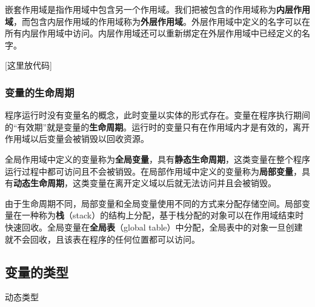 嵌套作用域是指作用域中包含另一个作用域。我们把被包含的作用域称为\textbf{内层作用域}，而包含内层作用域的作用域称为\textbf{外层作用域}。外层作用域中定义的名字可以在所有内层作用域中访问。内层作用域还可以重新绑定在外层作用域中已经定义的名字。

[这里放代码]

\subsubsection{变量的生命周期}

程序运行时没有变量名的概念，此时变量以实体的形式存在。变量在程序执行期间的``有效期''就是变量的\textbf{生命周期}。运行时的变量只有在作用域内才是有效的，离开作用域以后变量会被销毁以回收资源。

全局作用域中定义的变量称为\textbf{全局变量}，具有\textbf{静态生命周期}，这类变量在整个程序运行过程中都可访问且不会被销毁。在局部作用域中定义的变量称为\textbf{局部变量}，具有\textbf{动态生命周期}，这类变量在离开定义域以后就无法访问并且会被销毁。

由于生命周期不同，局部变量和全局变量使用不同的方式来分配存储空间。局部变量在一种称为\textbf{栈}（stack）的结构上分配，基于栈分配的对象可以在作用域结束时快速回收。全局变量在\textbf{全局表}（global table）中分配，全局表中的对象一旦创建就不会回收，且该表在程序的任何位置都可以访问。

\subsection{变量的类型}

动态类型

